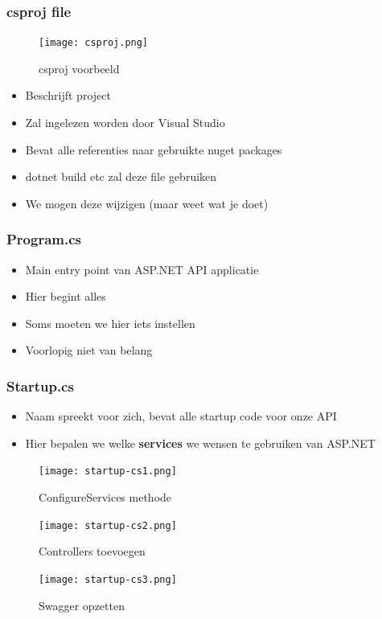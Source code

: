 \documentclass{article}
\begin{document}
\subsubsection{csproj file}

\begin{figure}[H]
    \centering
    \texttt{[image: csproj.png]}
    \caption{csproj voorbeeld}
\end{figure}

\begin{itemize}
    \item Beschrijft project
    \item Zal ingelezen worden door Visual Studio
    \item Bevat alle referenties naar gebruikte nuget packages
    \item dotnet build etc zal deze file gebruiken
    \item We mogen deze wijzigen (maar weet wat je doet)
\end{itemize}



\subsubsection{Program.cs}

\begin{itemize}
    \item Main entry point van ASP.NET API applicatie
    \item Hier begint alles
    \item Soms moeten we hier iets instellen
    \item Voorlopig niet van belang
\end{itemize}

\subsubsection{Startup.cs}

\begin{itemize}
    \item Naam spreekt voor zich, bevat alle startup code voor onze API
    \item Hier bepalen we welke \textbf{services} we wensen te gebruiken van ASP.NET 
        
        
\end{itemize}

\begin{figure}[H]
    \centering
    \texttt{[image: startup-cs1.png]}
    \caption{ConfigureServices methode}
\end{figure}
\begin{figure}[H]
    \centering
    \texttt{[image: startup-cs2.png]}
    \caption{Controllers toevoegen}
\end{figure}
\begin{figure}[H]
    \centering
    \texttt{[image: startup-cs3.png]}
    \caption{Swagger opzetten}
\end{figure}
\end{document}
